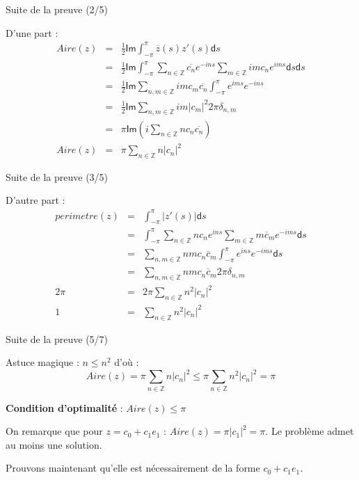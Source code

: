 \documentclass[11pt,envcountsect,aspectratio=169]{beamer} %
\newcommand{\Z}{\mathbb{Z}}
\renewcommand{\d}{\mathsf{d}}
\renewcommand{\Im}{\mathsf{Im}}
\renewcommand{\ss}{\vspace*{\baselineskip}}
\begin{document}
\begin{frame}{Suite de la preuve (2/5)}

    D'une part :
    \begin{eqnarray*}
    Aire(z) &=& \frac{1}{2} \Im \int_{-\pi}^{\pi}{\overline{z}(s) z'(s) \d s} \\
    &=& \frac{1}{2} \Im \int_{-\pi}^{\pi}{ \sum_{n\in \Z}{\overline{c_n} e^{-ins}} \sum_{m\in \Z}{imc_n e^{ims}} \d s}\d s\\
    &=& \frac{1}{2} \Im \sum_{n,m\in \Z}{ im c_m \overline{c_n} \int_{-\pi}^{\pi}{e^{ims}e^{-ins}} } \\
    &=& \frac{1}{2} \Im \sum_{n,m\in \Z}{ im |c_m|^2 2\pi \delta_{n,m} } \\
    &=& \pi \Im\left( i\sum_{n\in \Z}{ n c_n \overline{c_n}}\right) \\
    Aire(z) &=&  \pi\sum_{n\in\Z}n|c_n|^2
    \end{eqnarray*}

\end{frame}

\begin{frame}{Suite de la preuve (3/5)}

    D'autre part :
    \begin{eqnarray*}
    perimetre(z) &=& \int_{-\pi}^\pi |z'(s)|\d s \\
    &=& \int_{-\pi}^{\pi}{ \sum_{n \in \Z}{n c_n e^{ins}} \sum_{m \in \Z}{m \overline{c}_m e^{-ims}} \d s}\\
    &=& \sum_{n,m \in \Z}{ nm c_n \overline{c}_m \int_{-\pi}^{\pi}{ e^{ins} e^{-ims} \d s} } \\
    &=& \sum_{n,m \in \Z}{ nm c_n \overline{c}_m 2\pi \delta_{n,m} } \\
    2\pi &=& 2\pi \sum_{n\in\Z}n^2|c_n|^2 \\
    1 &=& \sum_{n\in\Z}n^2|c_n|^2
    \end{eqnarray*}
    
\end{frame}

\begin{frame}{Suite de la preuve (5/7)}

    Astuce magique : $n\leqslant n^2$ d'où :
    \[ Aire(z) = \pi \sum_{n\in \Z}{n|c_n|^2} \leqslant \pi \sum_{n\in \Z}{n^2|c_n|^2} = \pi\]
    \ss

    \textbf{Condition d'optimalité} : $Aire(z) \leqslant \pi$
    \ss
    
    On remarque que pour $z=c_0+c_1e_1$ : $Aire(z) = \pi |c_1|^2 = \pi$. Le problème admet au moins une solution.
    
    Prouvons maintenant qu'elle est nécessairement de la forme $c_0+c_1e_1$.
    
\end{frame}
\end{document}
